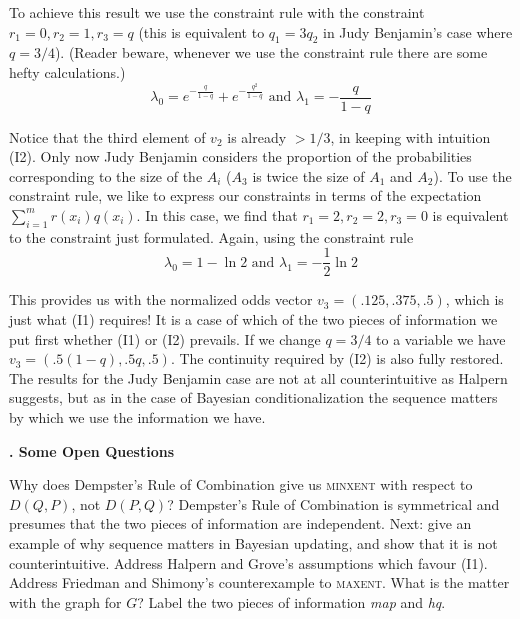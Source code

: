\documentclass[11pt]{article}
\newcommand{\kapt}[1]{\textbf{{\thechap}. #1}\addtocounter{chap}{1}}
\begin{document}
To achieve this result we use the constraint rule with the constraint
$r_{1}=0,r_{2}=1,r_{3}=q$ (this is equivalent to $q_{1}=3q_{2}$ in
Judy Benjamin's case where $q=3/4$). (Reader beware, whenever we use
the constraint rule there are some hefty calculations.)
\begin{equation}
  \label{eq:revconlambda0}
  \lambda_{0}=e^{-\frac{q}{1-q}}+e^{-\frac{q^{2}}{1-q}}\mbox{ and }\lambda_{1}=-\frac{q}{1-q}
\end{equation}

Notice that the third element of $v_{2}$ is already $>1/3$, in keeping
with intuition (I2). Only now Judy Benjamin considers the proportion
of the probabilities corresponding to the size of the $A_{i}$ ($A_{3}$
is twice the size of $A_{1}$ and $A_{2}$). To use the constraint rule,
we like to express our constraints in terms of the expectation
$\sum_{i=1}^{m}r(x_{i})q(x_{i})$. In this case, we find that
$r_{1}=2,r_{2}=2,r_{3}=0$ is equivalent to the constraint just
formulated. Again, using the constraint rule
\begin{equation}
  \label{eq:revconlambda1}
  \lambda_{0}=1-\ln{}2\mbox{ and }\lambda_{1}=-\frac{1}{2}\ln{}2
\end{equation}

This provides us with the normalized odds vector
$v_{3}=(.125,.375,.5)$, which is just what (I1) requires! It is a case
of which of the two pieces of information we put first whether (I1) or
(I2) prevails. If we change $q=3/4$ to a variable we have
$v_{3}=(.5(1-q),.5q,.5)$. The continuity required by (I2) is also
fully restored. The results for the Judy Benjamin case are not at all
counterintuitive as Halpern suggests, but as in the case of Bayesian
conditionalization the sequence matters by which we use the
information we have.

\kapt{Some Open Questions}

Why does Dempster's Rule of Combination give us \textsc{minxent} with
respect to $D(Q,P)$, not $D(P,Q)$? Dempster's Rule of Combination is
symmetrical and presumes that the two pieces of information are
independent. Next: give an example of why sequence matters in Bayesian
updating, and show that it is not counterintuitive. Address Halpern
and Grove's assumptions which favour (I1). Address Friedman and
Shimony's counterexample to \textsc{maxent}. What is the matter with
the graph for $G$? Label the two pieces of information \emph{map} and
\emph{hq}. 







\end{document}
